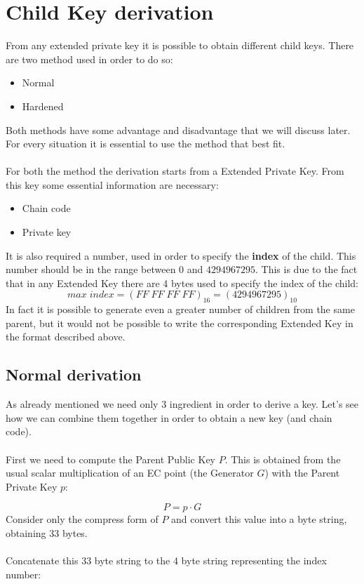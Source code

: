 \section{Child Key derivation}
From any extended private key it is possible to obtain different child keys. There are two method used in order to do so:
\begin{itemize}
	\item Normal
	\item Hardened
\end{itemize}
Both methods have some advantage and disadvantage that we will discuss later. For every situation it is essential to use the method that best fit.
\\ \\
For both the method the derivation starts from a Extended Private Key. From this key some essential information are necessary:
\begin{itemize}[label=$\star$]
	\item Chain code
	\item Private key
\end{itemize}
It is also required a number, used in order to specify the \textbf{index} of the child. This number should be in the range between $0$ and $4294967295$. This is due to the fact that in any Extended Key there are 4 bytes used to specify the index of the child:
\begin{equation*}
	max \; index=(FF\;FF\;FF\;FF)_{16} = (4294967295)_{10}
\end{equation*}
In fact it is possible to generate even a greater number of children from the same parent, but it would not be possible to write the corresponding Extended Key in the format described above.


\subsection{Normal derivation}

As already mentioned we need only 3 ingredient in order to derive a key. Let's see how we can combine them together in order to obtain a new key (and chain code). \\ \\
First we need to compute the Parent Public Key $P$. This is obtained from the usual scalar multiplication of an EC point (the Generator $G$) with the Parent Private Key $p$:

\begin{equation*}
P=p\cdot G
\end{equation*}
Consider only the compress form of $P$ and convert this value into a byte string, obtaining 33 bytes.
\\ \\
Concatenate this 33 byte string to the 4 byte string representing the index number:

